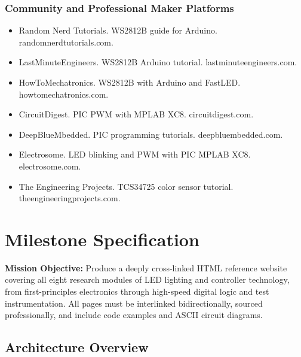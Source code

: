 \documentclass[11pt,letterpaper]{article}
\newcommand{\stageheader}[2]{%
  \noindent\colorbox{#2}{\makebox[\textwidth][l]{%
    \textcolor{white}{\bfseries\sffamily\hspace{6pt}#1\hspace{6pt}}}}%
  \vspace{0.5em}\par%
}
\begin{document}
\subsubsection{Community and Professional Maker Platforms}

\begin{itemize}[noitemsep]
  \item Random Nerd Tutorials. WS2812B guide for Arduino. randomnerdtutorials.com.
  \item LastMinuteEngineers. WS2812B Arduino tutorial. lastminuteengineers.com.
  \item HowToMechatronics. WS2812B with Arduino and FastLED. howtomechatronics.com.
  \item CircuitDigest. PIC PWM with MPLAB XC8. circuitdigest.com.
  \item DeepBlueMbedded. PIC programming tutorials. deepbluembedded.com.
  \item Electrosome. LED blinking and PWM with PIC MPLAB XC8. electrosome.com.
  \item The Engineering Projects. TCS34725 color sensor tutorial. theengineeringprojects.com.
\end{itemize}

\newpage
\stageheader{STAGE 3 --- MISSION PACKAGE}{tertiary}

\section{Milestone Specification}

\textbf{Mission Objective:} Produce a deeply cross-linked HTML reference website covering all eight research modules of LED lighting and controller technology, from first-principles electronics through high-speed digital logic and test instrumentation. All pages must be interlinked bidirectionally, sourced professionally, and include code examples and ASCII circuit diagrams.

\subsection{Architecture Overview}
\end{document}
